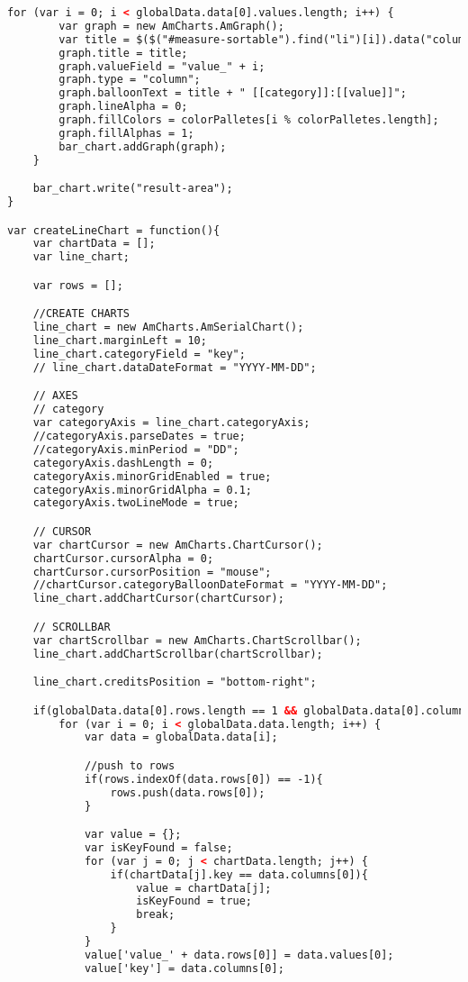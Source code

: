 \begin{lstlisting}[language=HTML,basicstyle=\tiny,caption=script.js]
    for (var i = 0; i < globalData.data[0].values.length; i++) {
        var graph = new AmCharts.AmGraph();
        var title = $($("#measure-sortable").find("li")[i]).data("column");
        graph.title = title;
        graph.valueField = "value_" + i;
        graph.type = "column";
        graph.balloonText = title + " [[category]]:[[value]]";
        graph.lineAlpha = 0;
        graph.fillColors = colorPalletes[i % colorPalletes.length];
        graph.fillAlphas = 1;
        bar_chart.addGraph(graph);
    }

    bar_chart.write("result-area");
}

var createLineChart = function(){
    var chartData = [];
    var line_chart;

    var rows = [];

    //CREATE CHARTS
    line_chart = new AmCharts.AmSerialChart();
    line_chart.marginLeft = 10;
    line_chart.categoryField = "key";
    // line_chart.dataDateFormat = "YYYY-MM-DD";

    // AXES
    // category
    var categoryAxis = line_chart.categoryAxis;
    //categoryAxis.parseDates = true;
    //categoryAxis.minPeriod = "DD";
    categoryAxis.dashLength = 0;
    categoryAxis.minorGridEnabled = true;
    categoryAxis.minorGridAlpha = 0.1;
    categoryAxis.twoLineMode = true;

    // CURSOR
    var chartCursor = new AmCharts.ChartCursor();
    chartCursor.cursorAlpha = 0;
    chartCursor.cursorPosition = "mouse";
    //chartCursor.categoryBalloonDateFormat = "YYYY-MM-DD";
    line_chart.addChartCursor(chartCursor);

    // SCROLLBAR
    var chartScrollbar = new AmCharts.ChartScrollbar();
    line_chart.addChartScrollbar(chartScrollbar);

    line_chart.creditsPosition = "bottom-right";

    if(globalData.data[0].rows.length == 1 && globalData.data[0].columns.length == 1 && globalData.data[0].values.length == 1){
        for (var i = 0; i < globalData.data.length; i++) {
            var data = globalData.data[i];

            //push to rows
            if(rows.indexOf(data.rows[0]) == -1){
                rows.push(data.rows[0]);
            }

            var value = {};
            var isKeyFound = false;
            for (var j = 0; j < chartData.length; j++) {
                if(chartData[j].key == data.columns[0]){
                    value = chartData[j];
                    isKeyFound = true;
                    break;
                }
            }
            value['value_' + data.rows[0]] = data.values[0];
            value['key'] = data.columns[0];


\end{lstlisting}
